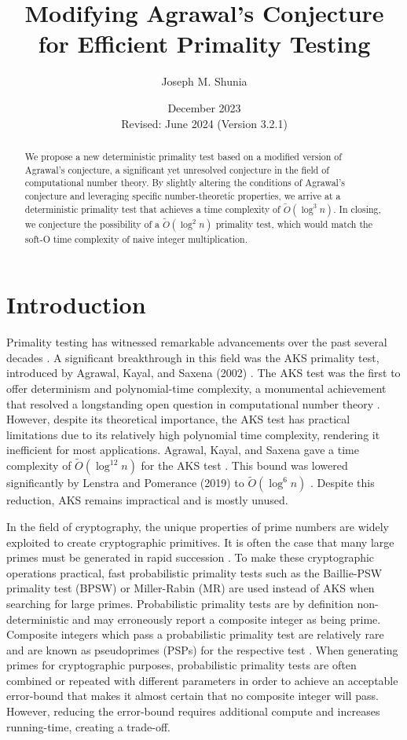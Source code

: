 \documentclass{article}
\title{Modifying Agrawal's Conjecture for Efficient Primality Testing}
\author{Joseph M. Shunia}
\date{December 2023 \\ \small Revised: June 2024 (Version 3.2.1) \normalsize}
\theoremstyle{plain}
\theoremstyle{definition}
\begin{document}
\maketitle

\begin{abstract}
We propose a new deterministic primality test based on a modified version of Agrawal's conjecture, a significant yet unresolved conjecture in the field of computational number theory. By slightly altering the conditions of Agrawal's conjecture and leveraging specific number-theoretic properties, we arrive at a deterministic primality test that achieves a time complexity of $\tilde{O}(\log^3 n)$. In closing, we conjecture the possibility of a $\tilde{O}(\log^2 n)$ primality test, which would match the soft-O time complexity of naive integer multiplication.
\end{abstract}

\section{Introduction}
Primality testing has witnessed remarkable advancements over the past several decades \cite{miller1976, baillie1980, rabin1980, wagstaff1982pseudoprimes, aks2002}. A significant breakthrough in this field was the AKS primality test, introduced by Agrawal, Kayal, and Saxena (2002) \cite{aks2002}. The AKS test was the first to offer determinism and polynomial-time complexity, a monumental achievement that resolved a longstanding open question in computational number theory \cite{goldreich2008}. However, despite its theoretical importance, the AKS test has practical limitations due to its relatively high polynomial time complexity, rendering it inefficient for most applications. Agrawal, Kayal, and Saxena gave a time complexity of $\tilde{O}(\log^{12} n)$ for the AKS test \cite{aks2002}. This bound was lowered significantly by Lenstra and Pomerance (2019) to $\tilde{O}(\log^6 n)$ \cite{lenstra2019gaussian}. Despite this reduction, AKS remains impractical and is mostly unused.

In the field of cryptography, the unique properties of prime numbers are widely exploited to create cryptographic primitives. It is often the case that many large primes must be generated in rapid succession \cite{lenstra1987elliptic}. To make these cryptographic operations practical, fast probabilistic primality tests such as the Baillie-PSW primality test (BPSW) \cite{baillie1980} or Miller-Rabin (MR) \cite{miller1976, rabin1980} are used instead of AKS when searching for large primes. Probabilistic primality tests are by definition non-deterministic and may erroneously report a composite integer as being prime. Composite integers which pass a probabilistic primality test are relatively rare and are known as pseudoprimes (PSPs) for the respective test \cite{wagstaff1982pseudoprimes}. When generating primes for cryptographic purposes, probabilistic primality tests are often combined or repeated with different parameters in order to achieve an acceptable error-bound that makes it almost certain that no composite integer will pass. However, reducing the error-bound requires additional compute and increases running-time, creating a trade-off.
\end{document}
